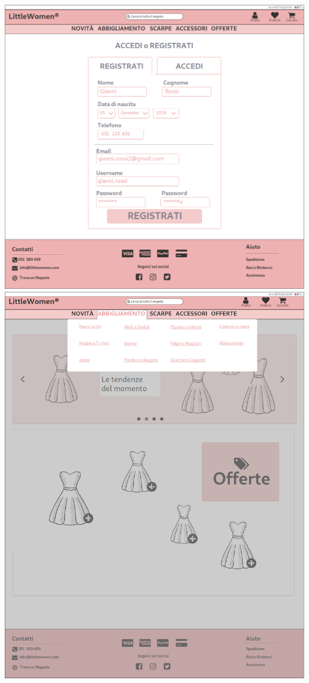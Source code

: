 \documentclass[12pt,a4paper]{report}
\begin{document}
\includegraphics[width=\textwidth]{"Project Management Sources/Wireframe/WireFrame Screenshot/Desktop/3 - Registrazione"}
\includegraphics[width=\textwidth]{"Project Management Sources/Wireframe/WireFrame Screenshot/Desktop/4 - Menu"}
\end{document}
